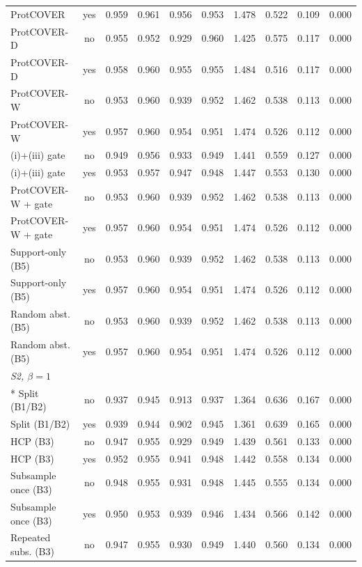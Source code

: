\begin{longtable}{lccccccccc}
ProtCOVER & yes & 0.959 & 0.961 & 0.956 & 0.953 & 1.478 & 0.522 & 0.109 & 0.000 \\
ProtCOVER-D & no & 0.955 & 0.952 & 0.929 & 0.960 & 1.425 & 0.575 & 0.117 & 0.000 \\
ProtCOVER-D & yes & 0.958 & 0.960 & 0.955 & 0.955 & 1.484 & 0.516 & 0.117 & 0.000 \\
ProtCOVER-W & no & 0.953 & 0.960 & 0.939 & 0.952 & 1.462 & 0.538 & 0.113 & 0.000 \\
ProtCOVER-W & yes & 0.957 & 0.960 & 0.954 & 0.951 & 1.474 & 0.526 & 0.112 & 0.000 \\
(i)+(iii) gate & no & 0.949 & 0.956 & 0.933 & 0.949 & 1.441 & 0.559 & 0.127 & 0.000 \\
(i)+(iii) gate & yes & 0.953 & 0.957 & 0.947 & 0.948 & 1.447 & 0.553 & 0.130 & 0.000 \\
ProtCOVER-W + gate & no & 0.953 & 0.960 & 0.939 & 0.952 & 1.462 & 0.538 & 0.113 & 0.000 \\
ProtCOVER-W + gate & yes & 0.957 & 0.960 & 0.954 & 0.951 & 1.474 & 0.526 & 0.112 & 0.000 \\
Support-only (B5) & no & 0.953 & 0.960 & 0.939 & 0.952 & 1.462 & 0.538 & 0.113 & 0.000 \\
Support-only (B5) & yes & 0.957 & 0.960 & 0.954 & 0.951 & 1.474 & 0.526 & 0.112 & 0.000 \\
Random abst. (B5) & no & 0.953 & 0.960 & 0.939 & 0.952 & 1.462 & 0.538 & 0.113 & 0.000 \\
Random abst. (B5) & yes & 0.957 & 0.960 & 0.954 & 0.951 & 1.474 & 0.526 & 0.112 & 0.000 \\
\midrule
\multicolumn{10}{l}{\emph{S2, $\beta=1$}}\\*
Split (B1/B2) & no & 0.937 & 0.945 & 0.913 & 0.937 & 1.364 & 0.636 & 0.167 & 0.000 \\
Split (B1/B2) & yes & 0.939 & 0.944 & 0.902 & 0.945 & 1.361 & 0.639 & 0.165 & 0.000 \\
HCP (B3) & no & 0.947 & 0.955 & 0.929 & 0.949 & 1.439 & 0.561 & 0.133 & 0.000 \\
HCP (B3) & yes & 0.952 & 0.955 & 0.941 & 0.948 & 1.442 & 0.558 & 0.134 & 0.000 \\
Subsample once (B3) & no & 0.948 & 0.955 & 0.931 & 0.948 & 1.445 & 0.555 & 0.134 & 0.000 \\
Subsample once (B3) & yes & 0.950 & 0.953 & 0.939 & 0.946 & 1.434 & 0.566 & 0.142 & 0.000 \\
Repeated subs. (B3) & no & 0.947 & 0.955 & 0.930 & 0.949 & 1.440 & 0.560 & 0.134 & 0.000 \\

\end{longtable}

